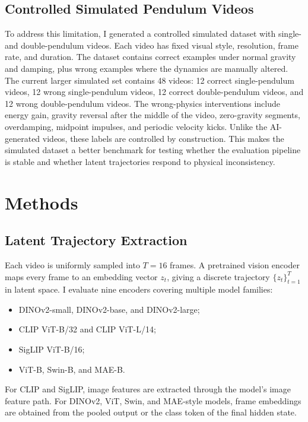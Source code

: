 \documentclass[final-report]{report-template}
\begin{document}
\subsection{Controlled Simulated Pendulum Videos}
To address this limitation, I generated a controlled simulated dataset with
single- and double-pendulum videos. Each video has fixed visual style,
resolution, frame rate, and duration. The dataset contains correct examples
under normal gravity and damping, plus wrong examples where the dynamics are
manually altered. The current larger simulated set contains 48 videos: 12 correct single-pendulum
videos, 12 wrong single-pendulum videos, 12 correct double-pendulum videos, and
12 wrong double-pendulum videos. The wrong-physics interventions include energy
gain, gravity reversal after the middle of the video, zero-gravity segments,
overdamping, midpoint impulses, and periodic velocity kicks. Unlike the
AI-generated videos, these labels are controlled by construction. This makes the
simulated dataset a better benchmark for testing whether the evaluation pipeline
is stable and whether latent trajectories respond to physical inconsistency.

\section{Methods}
\subsection{Latent Trajectory Extraction}
Each video is uniformly sampled into $T=16$ frames. A pretrained vision encoder
maps every frame to an embedding vector $z_t$, giving a discrete trajectory
$\{z_t\}_{t=1}^{T}$ in latent space. I evaluate nine encoders covering multiple
model families:

\begin{itemize}
    \item DINOv2-small, DINOv2-base, and DINOv2-large;
    \item CLIP ViT-B/32 and CLIP ViT-L/14;
    \item SigLIP ViT-B/16;
    \item ViT-B, Swin-B, and MAE-B.
\end{itemize}

For CLIP and SigLIP, image features are extracted through the model's image
feature path. For DINOv2, ViT, Swin, and MAE-style models, frame embeddings are
obtained from the pooled output or the class token of the final hidden state.
\end{document}
